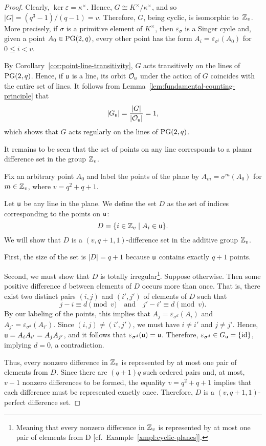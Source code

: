 \begin{proof}
    Clearly, $\ker\varepsilon=\kappa^\times$. Hence, $G\cong K^\times/\kappa^\times$, and so $|G|=(q^3-1)/(q-1)=v$. Therefore, $G$, being cyclic, is isomorphic to~$\mathbb{Z}_v$. More precisely, if $\sigma$ is a primitive element of $K^\times$, then $\varepsilon_\sigma$ is a Singer cycle and, given a point $A_0\in\operatorname{PG}(2,q)$, every other point has the form $A_i=\varepsilon_{\sigma^i}(A_0)$ for $0\le i<v$.

    By Corollary~\ref{cor:point-line-transitivity}, $G$ acts transitively on the lines of $\operatorname{PG}(2,q)$. Hence, if $\mathsf u$ is a line, its orbit $\mathcal{O}_{\mathsf u}$ under the action of $G$ coincides with the entire set of lines. It follows from Lemma~\ref{lem:fundamental-counting-principle} that
    \[
        |G_{\mathsf u}| = \frac{|G|}{|\mathcal{O}_{\mathsf u}|} = 1,
    \]
    which shows that $G$ acts regularly on the lines of $\operatorname{PG}(2,q)$.

    It remains to be seen that the set of points on any line corresponds to a planar difference set in the group\/ $\mathbb{Z}_v$.

    Fix an arbitrary point $A_0$ and label the points of the plane by $A_m = \sigma^m(A_0)$ for $m \in \mathbb{Z}_v$, where $v = q^2+q+1$.

    Let $\mathsf{u}$ be any line in the plane. We define the set $D$ as the set of indices corresponding to the points on $\mathsf{u}$:
    \[
        D = \{i \in \mathbb{Z}_v \mid A_i \in \mathsf{u}\}.
    \]
    We will show that $D$ is a $(v, q+1, 1)$-difference set in the additive group $\mathbb{Z}_v$.
    
    First, the size of the set is $|D|=q+1$ because $\mathsf u$ contains exactly $q+1$ points.
    
    Second, we must show that $D$ is totally irregular\footnote{Meaning that every nonzero difference in $\mathbb{Z}_v$ is represented by at most one pair of elements from D [cf.~Example~\ref{xmpl:cyclic-planes}].}. Suppose otherwise. Then some positive difference $d$ between elements of $D$ occurs more than once. That is, there exist two distinct pairs $(i,j)$ and $(i',j')$ of elements of $D$ such that
    \[
        j - i \equiv d \pmod{v}
        \quad\text{and}\quad
        j' - i' \equiv d \pmod{v}.
    \]
    By our labeling of the points, this implies that $A_j = \varepsilon_{\sigma^d}(A_i)$ and $A_{j'} = \varepsilon_{\sigma^d}(A_{i'})$. Since $(i,j)\ne(i',j')$, we must have $i \ne i'$ and $j \ne j'$. Hence, $\mathsf u = A_iA_{i'} = A_jA_{j'}$, and it follows that $\varepsilon_{\sigma^d}(\mathsf u) = \mathsf u$. Therefore, $\varepsilon_{\sigma^d} \in G_{\mathsf u} = \{\operatorname{id}\}$, implying $d = 0$, a contradiction.


    Thus, every nonzero difference in $\mathbb{Z}_v$ is represented by at most one pair of elements from $D$. Since there are $(q+1)q$ such ordered pairs and, at most, $v-1$ nonzero differences to be formed, the equality $v=q^2+q+1$ implies that each difference must be represented exactly once. Therefore, $D$ is a $(v,q+1,1)$-perfect difference set.
    
\end{proof}

